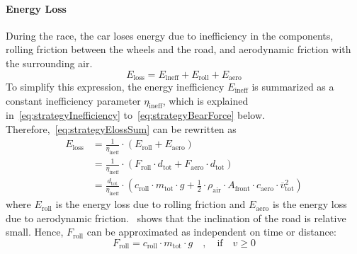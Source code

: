 \paragraph{Energy Loss}
During the race, the car loses energy due to inefficiency in the components, rolling friction between the wheels and the road, and aerodynamic friction with the surrounding air.
\begin{equation}
	E_\mathrm{loss} = E_\mathrm{ineff} + E_\mathrm{roll} + E_\mathrm{aero} \label{eq:strategyElossSum}
\end{equation}
To simplify this expression, the energy inefficiency $E_\mathrm{ineff}$ is summarized as a constant inefficiency parameter $\eta_\mathrm{ineff}$, which is explained in~\cref{eq:strategyInefficiency} to~\cref{eq:strategyBearForce} below. Therefore,~\cref{eq:strategyElossSum} can be rewritten as
\begin{align}
	E_\mathrm{loss} &= \frac{1}{\eta_\mathrm{ineff}} \cdot (E_\mathrm{roll} + E_\mathrm{aero}) \label{eq:strategyElossApproxIneff}\\
	&= \frac{1}{\eta_\mathrm{ineff}} \cdot (F_\mathrm{roll} \cdot d_\mathrm{tot} + F_\mathrm{aero} \cdot d_\mathrm{tot}) \\
	&= \frac{d_\mathrm{tot}}{\eta_\mathrm{ineff}} \cdot \left(c_\mathrm{roll} \cdot m_\mathrm{tot} \cdot g + \frac{1}{2} \cdot \rho_\mathrm{air} \cdot A_\mathrm{front} \cdot c_\mathrm{aero} \cdot \overline{v}_\mathrm{tot}^2 \right) \label{eq:strategyELossVel}
\end{align}
where $E_\mathrm{roll}$ is the energy loss due to rolling friction and $E_\mathrm{aero}$ is the energy loss due to aerodynamic friction.~ shows that the inclination of the road is relative small. Hence, $F_\mathrm{roll}$ can be approximated as independent on time or distance:
\begin{equation}
	F_\mathrm{roll} = c_\mathrm{roll} \cdot m_\mathrm{tot} \cdot g \quad , \quad \text{if} \quad v \geq 0
\end{equation}

